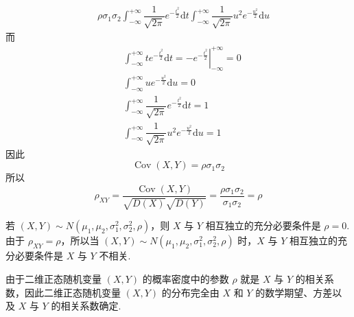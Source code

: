 \begin{myproof}
$$\begin{aligned}
        & \; \rho \sigma_1 \sigma_2 \int_{-\infty}^{+\infty} \dfrac{1}{\sqrt{2 \pi}} e^{-\frac{t^2}{2}} \text{d}t \int_{-\infty}^{+\infty} \dfrac{1}{\sqrt{2 \pi}} u^2 e^{-\frac{u^2}{2}} \text{d}u
    \end{aligned}
    $$
    而
    $$
    \begin{aligned}
        & \int_{-\infty}^{+\infty} t e^{-\frac{t^2}{2}} \text{d}t = \left. -e^{-\frac{t^2}{2}} \right|_{-\infty}^{+\infty} = 0 \\
        & \int_{-\infty}^{+\infty} u e^{-\frac{u^2}{2}} \text{d}u = 0 \\
        & \int_{-\infty}^{+\infty} \dfrac{1}{\sqrt{2 \pi}} e^{-\frac{t^2}{2}} \text{d}t = 1 \\
        & \int_{-\infty}^{+\infty} \dfrac{1}{\sqrt{2 \pi}} u^2 e^{-\frac{u^2}{2}} \text{d}u = 1
    \end{aligned}
    $$
    因此
    $$
    \operatorname{Cov}(X,Y) = \rho \sigma_1 \sigma_2
    $$
    所以
    $$
    \rho_{XY} = \dfrac{\operatorname{Cov}(X,Y)}{\sqrt{D(X)} \sqrt{D(Y)}} = \dfrac{\rho \sigma_1 \sigma_2}{\sigma_1 \sigma_2} = \rho
    $$
\end{myproof}

若 $(X,Y) \sim N(\mu_1,\mu_2,\sigma_1^2,\sigma_2^2,\rho)$，则 $X$ 与 $Y$ 相互独立的充分必要条件是 $\rho=0$. 由于 $\rho_{XY} = \rho$，所以当 $(X,Y) \sim N(\mu_1,\mu_2,\sigma_1^2,\sigma_2^2,\rho)$ 时，$X$ 与 $Y$ 相互独立的充分必要条件是 $X$ 与 $Y$ 不相关.

由于二维正态随机变量 $(X,Y)$ 的概率密度中的参数 $\rho$ 就是 $X$ 与 $Y$ 的相关系数，因此二维正态随机变量 $(X,Y)$ 的分布完全由 $X$ 和 $Y$ 的数学期望、方差以及 $X$ 与 $Y$ 的相关系数确定.